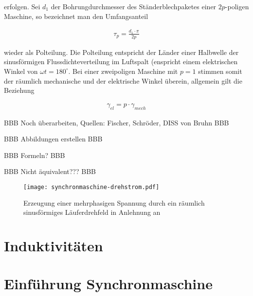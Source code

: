 erfolgen.
Sei $d_1$ der Bohrungdurchmesser des Ständerblechpaketes einer $2p$-poligen Maschine, so bezeichnet man den Umfangsanteil

\begin{align}
\tau_p = \frac{d_1 \cdot \pi}{2p}
\end{align}

wieder als Polteilung.
Die Polteilung entspricht der Länder einer Halbwelle der sinusförmigen Flussdichteverteilung im Luftspalt (enspricht einem elektrischen Winkel von $\omega t = 180^{\circ}$.
Bei einer zweipoligen Maschine mit $p=1$ stimmen somit der räumlich mechanische und der elektrische Winkel überein, allgemein gilt die Beziehung \autocite[S.141f.]{fischer2009}

\begin{align}
\gamma_{el} = p\cdot \gamma_{mech}
\end{align}

BBB Noch überarbeiten, Quellen: Fischer, Schröder, DISS von Bruhn BBB

BBB Abbildungen erstellen BBB

BBB Formeln? BBB

BBB Nicht äquivalent??? BBB

\begin{figure}[!htb]
\centering
\texttt{[image: synchronmaschine-drehstrom.pdf]}
\label{fig:drehstromwicklung}
\caption{Erzeugung einer mehrphasigen Spannung durch ein räumlich sinusförmiges Läuferdrehfeld in Anlehnung an \autocite[S.~141]{fischer2009}}
\end{figure}

\section{Induktivitäten}\label{sec:induktiv}

\section{Einführung Synchronmaschine}\label{sec:synchron}

